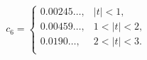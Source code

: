 \[c_{6}=\begin{cases}0.00245\ldots,&\left|t\right|<1,\\
0.00459\ldots,&1<\left|t\right|<2,\\
0.0190\ldots,&2<\left|t\right|<3.\\
\end{cases}\]